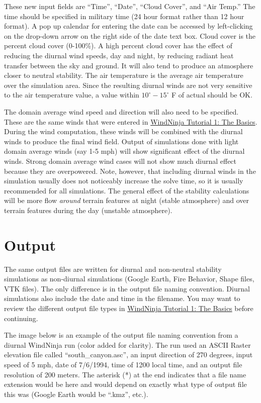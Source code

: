 \documentclass[12pt]{article}
\begin{document}
These new input fields are “Time”, “Date”, “Cloud Cover”, and “Air Temp.”  
The time should be specified in military time (24 hour format rather than 12 hour format).  
A pop up calendar for entering the date can be accessed by left-clicking on the drop-down arrow on the right side of the date text box.  Cloud cover is the percent cloud cover (0-100\%).  A high percent cloud cover has the effect of reducing the diurnal wind speeds, day and night, by reducing radiant heat transfer between the sky and ground.  It will also tend to produce an atmosphere closer to neutral stability. The air temperature is the average air temperature over the simulation area.  Since the resulting diurnal winds are not very sensitive to the air temperature value, a value within $10^{\circ} - 15^{\circ}$ F of actual should be OK.

The domain average wind speed and direction will also need to be specified.  
These are the same winds that were entered in \href{https://weather.firelab.org/windninja/tutorials/WindNinja_tutorial1.pdf}{WindNinja Tutorial 1: The Basics}.  
During the wind computation, these winds will be combined with the diurnal winds to produce the final wind field.  
Output of simulations done with light domain average winds (say 1-5 mph) will show significant effect of the diurnal winds.  
Strong domain average wind cases will not show much diurnal effect because they are overpowered.  
Note, however, that including diurnal winds in the simulation usually does not noticeably increase the solve time, so it is usually recommended for all simulations.  
The general effect of the stability calculations will be more flow \textit{around} terrain features at night (stable atmosphere) and over terrain features during the day (unstable atmosphere).

\section{Output}

The same output files are written for diurnal and non-neutral stability simulations as non-diurnal simulations (Google Earth, Fire Behavior, Shape files, VTK files).  
The only difference is in the output file naming convention.  
Diurnal simulations also include the date and time in the filename.  
You may want to review the different output file types in \href{https://weather.firelab.org/windninja/tutorials/WindNinja_tutorial1.pdf}{WindNinja Tutorial 1: The Basics} before continuing.

The image below is an example of the output file naming convention from a diurnal WindNinja run (color added for clarity).  
The run used an ASCII Raster elevation file called “south\_canyon.asc”, an input direction of 270 degrees, input speed of 5 mph, date of 7/6/1994, time of 1200 local time, and an output file resolution of 200 meters.  
The asterisk (*) at the end indicates that a file name extension would be here and would depend on exactly what type of output file this was (Google Earth would be “.kmz”, etc.).
\end{document}

